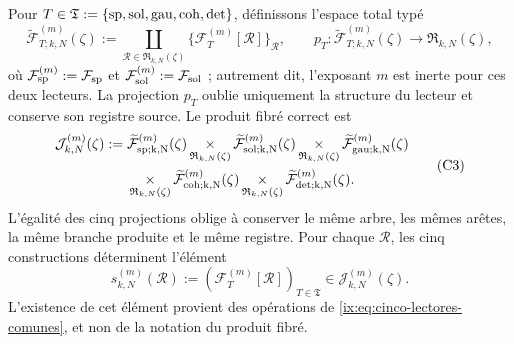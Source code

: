 Pour
\(T\in\mathfrak T:=\{{\rm sp},{\rm sol},{\rm gau},{\rm coh},{\rm det}\}\),
définissons l'espace total typé
\[
 \widetilde{\mathcal F}_{T;k,N}^{(m)}(\zeta)
 :=\coprod_{\mathscr R\in\mathfrak R_{k,N}(\zeta)}
   \{\mathcal F_T^{(m)}[\mathscr R]\}_{\mathscr R},
 \qquad
 p_T:\widetilde{\mathcal F}_{T;k,N}^{(m)}(\zeta)
      \longrightarrow\mathfrak R_{k,N}(\zeta),
\]
où \(\mathcal F_{\rm sp}^{(m)}:=\mathcal F_{\rm sp}\) et \(\mathcal F_{\rm sol}^{(m)}:=\mathcal F_{\rm sol}\) ; autrement dit, l'exposant \(m\) est inerte pour ces deux lecteurs. La projection \(p_T\) oublie uniquement la structure du lecteur et conserve son registre source. Le produit fibré correct est
\[
\begin{aligned}
 \mathcal J_{k,N}^{(m)}(\zeta):={}&
 \widetilde{\mathcal F}_{\rm sp;k,N}^{(m)}(\zeta)
 \mathop{\times}_{\mathfrak R_{k,N}(\zeta)}
 \widetilde{\mathcal F}_{\rm sol;k,N}^{(m)}(\zeta)
 \mathop{\times}_{\mathfrak R_{k,N}(\zeta)}
 \widetilde{\mathcal F}_{\rm gau;k,N}^{(m)}(\zeta)\\
 &\mathop{\times}_{\mathfrak R_{k,N}(\zeta)}
 \widetilde{\mathcal F}_{\rm coh;k,N}^{(m)}(\zeta)
 \mathop{\times}_{\mathfrak R_{k,N}(\zeta)}
 \widetilde{\mathcal F}_{\rm det;k,N}^{(m)}(\zeta).
\end{aligned}
\tag{C3}
\label{ix:eq:constructor-correlativo}
\]
L'égalité des cinq projections oblige à conserver le même arbre, les
mêmes arêtes, la même branche produite et le même registre. Pour chaque
\(\mathscr R\), les cinq constructions déterminent l'élément
\[
 s_{k,N}^{(m)}(\mathscr R)
 :=(\mathcal F_T^{(m)}[\mathscr R])_{T\in\mathfrak T}
 \in\mathcal J_{k,N}^{(m)}(\zeta).
\]
L'existence de cet élément provient des opérations de \eqref{ix:eq:cinco-lectores-comunes}, et non de la notation du produit fibré.

